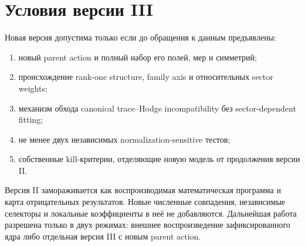\section{Условия версии III}

Новая версия допустима только если до обращения к данным предъявлены:
\begin{enumerate}
 \item новый parent action и полный набор его полей, мер и симметрий;
 \item происхождение rank-one structure, family axis и относительных
 sector weights;
 \item механизм обхода canonical trace--Hodge incompatibility без
 sector-dependent fitting;
 \item не менее двух независимых normalization-sensitive тестов;
 \item собственные kill-критерии, отделяющие новую модель от продолжения
 версии II.
\end{enumerate}

\begin{protocol}
Версия II замораживается как воспроизводимая математическая программа и
карта отрицательных результатов. Новые численные совпадения, независимые
селекторы и локальные коэффициенты в неё не добавляются. Дальнейшая работа
разрешена только в двух режимах: внешнее воспроизведение зафиксированного
ядра либо отдельная версия III с новым parent action.
\end{protocol}